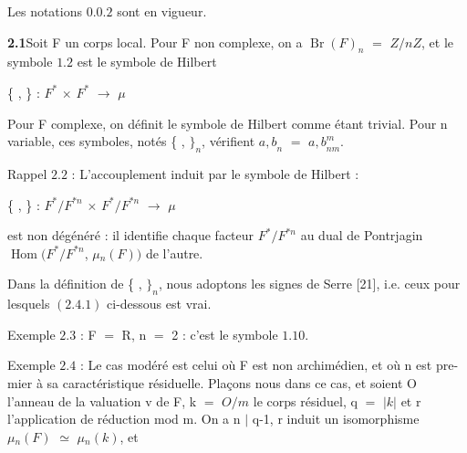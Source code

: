 \documentclass[10pt,a4paper]{article}
\begin{document}
\clearpage
{}
\label{d035-physical-014}
\par\medskip{}\par\smallskip
\par Les notations $0.0.2$ sont en vigueur.\par
\par\noindent\textbf{2.1}\quad Soit F un corps local. Pour F non complexe, on a $\operatorname{Br}(F)_n$ $=$ $Z/nZ$, et le symbole $1.2$ est le symbole de Hilbert\par
\par\smallskip\begin{center}\begin{minipage}{0.96\textwidth}\centering
\{ , \} : $F^*$ $\times{}$ $F^*$ $\to{}$ $\mu{}$
\end{minipage}\end{center}\smallskip
\par Pour F complexe, on définit le symbole de Hilbert comme étant trivial. Pour n variable, ces symboles, notés \{ , $\}_n$, vérifient ${a,b}_n$ $=$ ${a,b}_{nm}^m$.\par
\par Rappel $2.2$ : L'accouplement induit par le symbole de Hilbert :\par
\par\smallskip\begin{center}\begin{minipage}{0.96\textwidth}\centering
\{ , \} : $F^*/F^{*n}$ $\times{}$ $F^*/F^{*n}$ $\to{}$ $\mu{}$
\end{minipage}\end{center}\smallskip
\par est non dégénéré : il identifie chaque facteur $F^*/F^{*n}$ au dual de Pontrjagin $\operatorname{Hom}(F^*/F^{*n}$, $\mu{}_n(F))$ de l'autre.\par
\par Dans la définition de \{ , $\}_n$, nous adoptons les signes de Serre [21], i.e. ceux pour lesquels $(2.4.1)$ ci-dessous est vrai.\par
\par Exemple $2.3$ : F $=$ R, n $=$ 2 : c'est le symbole $1.10$.\par
\par Exemple $2.4$ : Le cas modéré est celui où F est non archimédien, et où n est pre-mier à sa caractéristique résiduelle. Plaçons nous dans ce cas, et soient O l'anneau de la valuation v de F, k $=$ $O/m$ le corps résiduel, q $=$ $|k|$ et r l'application de réduction mod m. On a n $|$ q-1, r induit un isomorphisme $\mu{}_n(F)$ $\simeq{}$ $\mu{}_n(k)$, et\par
\end{document}
